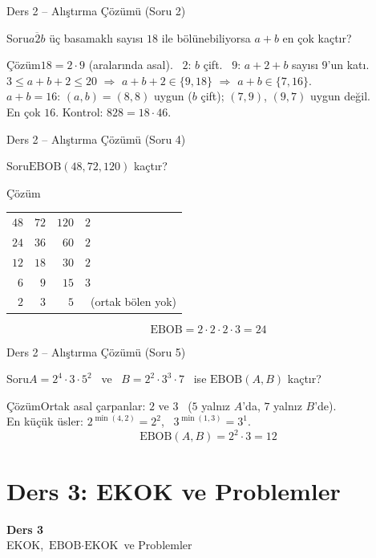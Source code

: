 \documentclass[aspectratio=169,11pt,handout]{beamer}
\newcommand{\soru}[3]{%
\begin{frame}{#1}
  \begin{block}{Soru}\large #2\end{block}
  \pause
  \begin{exampleblock}{Çözüm}\large #3\end{exampleblock}
\end{frame}}
\newcommand{\ab}[1]{\overline{#1}}
\begin{document}
\soru{Ders 2 -- Alıştırma Çözümü (Soru 2)}
{\(\ab{a2b}\) üç basamaklı sayısı \(18\) ile bölünebiliyorsa \(a+b\) en çok kaçtır?}
{\(18=2\cdot 9\) (aralarında asal). \ \(2\): \(b\) çift. \ \(9\): \(a+2+b\) sayısı \(9\)'un katı.\\[3pt]
\(3\le a+b+2\le 20\) \(\Rightarrow\) \(a+b+2\in\{9,18\}\) \(\Rightarrow\) \(a+b\in\{7,16\}\).\\[3pt]
\(a+b=16\): \((a,b)=(8,8)\) uygun (\(b\) çift); \((7,9)\), \((9,7)\) uygun değil.\\[3pt]
En çok \(16\). \quad Kontrol: \(828=18\cdot 46\).}

\soru{Ders 2 -- Alıştırma Çözümü (Soru 4)}
{\(\text{EBOB}(48,72,120)\) kaçtır?}
{{\normalsize
\begin{tabular}{rrr|l}
\(48\) & \(72\) & \(120\) & \(2\)\\
\(24\) & \(36\) & \(60\) & \(2\)\\
\(12\) & \(18\) & \(30\) & \(2\)\\
\(6\) & \(9\) & \(15\) & \(3\)\\
\(2\) & \(3\) & \(5\) & \ (ortak bölen yok)
\end{tabular}}
\[\text{EBOB}=2\cdot 2\cdot 2\cdot 3=24\]}

\soru{Ders 2 -- Alıştırma Çözümü (Soru 5)}
{\(A=2^4\cdot 3\cdot 5^2\) \ ve \ \(B=2^2\cdot 3^3\cdot 7\) \ ise \(\text{EBOB}(A,B)\) kaçtır?}
{Ortak asal çarpanlar: \(2\) ve \(3\) \ (\(5\) yalnız \(A\)'da, \(7\) yalnız \(B\)'de).\\[3pt]
En küçük üsler: \(2^{\min(4,2)}=2^2\), \ \(3^{\min(1,3)}=3^1\).
\[\text{EBOB}(A,B)=2^2\cdot 3=12\]}

\section{Ders 3: EKOK ve Problemler}
\begin{frame}
\centering\Large\color{anamavi}\textbf{Ders 3}\\[6pt]\normalsize EKOK, \(\text{EBOB}\cdot\text{EKOK}\) ve Problemler
\end{frame}
\end{document}
